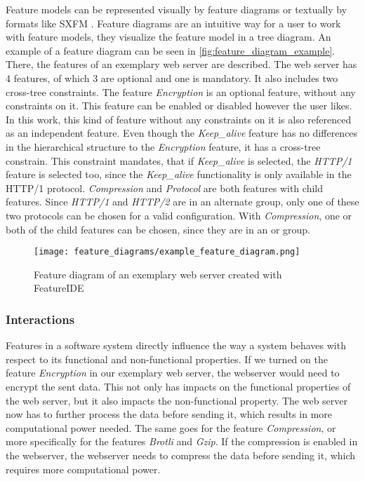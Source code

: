 \documentclass[../../thesis.tex]{subfiles}
\begin{document}
Feature models can be represented visually by feature diagrams or textually by formats like SXFM \cite{mendonca2009splot}.
Feature diagrams are an intuitive way for a user to work with feature models, they visualize the feature model in a tree diagram.
An example of a feature diagram can be seen in \autoref{fig:feature_diagram_example}. There, the features of an exemplary web server are described.
The web server has 4 features, of which 3 are optional and one is mandatory. It also includes two cross-tree constraints.
The feature \textit{Encryption} is an optional feature, without any constraints on it. This feature can be enabled or disabled however the
user likes. In this work, this kind of feature without any constraints on it is also referenced as an independent feature.
Even though the \textit{Keep\_alive} feature has no differences in the hierarchical structure to the \textit{Encryption} feature, it
has a cross-tree constrain. This constraint mandates, that if \textit{Keep\_alive} is selected, the \textit{HTTP/1} feature is selected too, since the
\textit{Keep\_alive} functionality is only available in the HTTP/1 protocol.
\textit{Compression} and \textit{Protocol} are both features with child features. Since \textit{HTTP/1} and \textit{HTTP/2} are in an
alternate group, only one of these two protocols can be chosen for a valid configuration.
With \textit{Compression}, one or both of the child features can be chosen, since they are in an or group.

\begin{figure}[]
  \texttt{[image: feature\_diagrams/example\_feature\_diagram.png]}
  \caption[Feature diagram - exemplary web server]{
    Feature diagram of an exemplary web server created with FeatureIDE
  }\label{fig:feature_diagram_example}
\end{figure}




\subsubsection{Interactions}

Features in a software system directly influence the way a system behaves with respect to its functional and non-functional properties.
If we turned on the feature \textit{Encryption} in our exemplary web server, the webserver would need to encrypt the sent data.
This not only has impacts on the functional properties of the web server, but it also impacts the non-functional property.
The web server now has to further process the data before sending it, which results in more computational power needed.
The same goes for the feature \textit{Compression}, or more  specifically for the features \textit{Brotli} and \textit{Gzip}.
If the compression is enabled in the webserver, the webserver needs to compress the data before sending it, which
requires more computational power.
\end{document}
